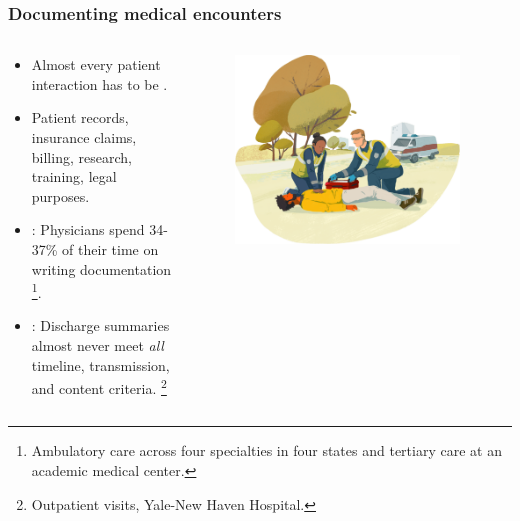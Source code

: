 \begin{frame}
    \frametitle{Documenting medical encounters}
    \begin{columns}
        \begin{column}{0.5\textwidth}
            \begin{itemize}
                \item <1-> Almost every patient interaction has to be .
                \item <1-> Patient records, insurance claims, billing, research, training, legal purposes.
                \vspace{1em}
                \item <2-> : Physicians spend 34-37\% of their time on writing documentation \cite{joukes_time_2018, tipping_where_2010, sinsky_allocation_2016}\footnote<2->{Ambulatory care across four specialties in four states and tertiary care at an academic medical center.}.
                \item <2-> : Discharge summaries almost never meet \emph{all} timeline, transmission, and content criteria. \cite{horwitz_comprehensive_2013}\footnote<2->{Outpatient visits, Yale-New Haven Hospital.}
            \end{itemize}
        \end{column}
        \begin{column}{0.5\textwidth}
            \begin{figure}
                \centering
                \includegraphics[width=0.95\textwidth]{figures/corti_sketch_responders.png}
            \end{figure}
        \end{column}
    \end{columns}

\end{frame}


